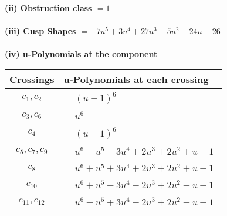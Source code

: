 \documentclass[1p]{elsarticle_modified}
\theoremstyle{definition}
\begin{document}
\flushleft \textbf{(ii) Obstruction class $= 1$}\\~\\
\flushleft \textbf{(iii) Cusp Shapes $= -7 u^5+3 u^4+27 u^3-5 u^2-24 u-26$}\\~\\
\newpage\renewcommand{\arraystretch}{1}
\flushleft \textbf{(iv) u-Polynomials at the component}\newline \\
\begin{tabular}{m{50pt}|m{274pt}}
Crossings & \hspace{64pt}u-Polynomials at each crossing \\
\hline $$\begin{aligned}c_{1},c_{2}\end{aligned}$$&$\begin{aligned}
&(u-1)^6
\end{aligned}$\\
\hline $$\begin{aligned}c_{3},c_{6}\end{aligned}$$&$\begin{aligned}
&u^6
\end{aligned}$\\
\hline $$\begin{aligned}c_{4}\end{aligned}$$&$\begin{aligned}
&(u+1)^6
\end{aligned}$\\
\hline $$\begin{aligned}c_{5},c_{7},c_{9}\end{aligned}$$&$\begin{aligned}
&u^6- u^5-3 u^4+2 u^3+2 u^2+u-1
\end{aligned}$\\
\hline $$\begin{aligned}c_{8}\end{aligned}$$&$\begin{aligned}
&u^6+u^5+3 u^4+2 u^3+2 u^2+u-1
\end{aligned}$\\
\hline $$\begin{aligned}c_{10}\end{aligned}$$&$\begin{aligned}
&u^6+u^5-3 u^4-2 u^3+2 u^2- u-1
\end{aligned}$\\
\hline $$\begin{aligned}c_{11},c_{12}\end{aligned}$$&$\begin{aligned}
&u^6- u^5+3 u^4-2 u^3+2 u^2- u-1
\end{aligned}$\\
\hline
\end{tabular}\\~\\
\end{document}
